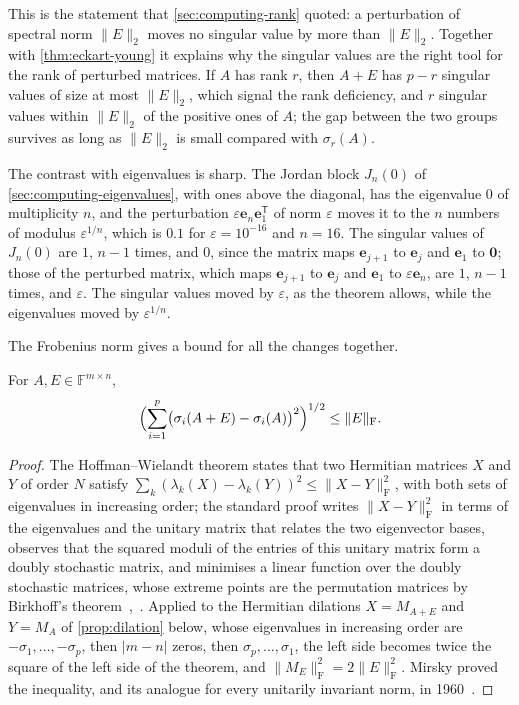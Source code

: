 This is the statement that \cref{sec:computing-rank} quoted: a perturbation of spectral norm $\|E\|_2$ moves no singular value by more than $\|E\|_2$. Together with \cref{thm:eckart-young} it explains why the singular values are the right tool for the rank of perturbed matrices. If $A$ has rank $r$, then $A+E$ has $p-r$ singular values of size at most $\|E\|_2$, which signal the rank deficiency, and $r$ singular values within $\|E\|_2$ of the positive ones of $A$; the gap between the two groups survives as long as $\|E\|_2$ is small compared with $\sigma_r(A)$.

The contrast with eigenvalues is sharp. The Jordan block $J_n(0)$ of \cref{sec:computing-eigenvalues}, with ones above the diagonal, has the eigenvalue $0$ of multiplicity $n$, and the perturbation $\varepsilon\mathbf e_n\mathbf e_1^{\mathsf T}$ of norm $\varepsilon$ moves it to the $n$ numbers of modulus $\varepsilon^{1/n}$, which is $0.1$ for $\varepsilon=10^{-16}$ and $n=16$. The singular values of $J_n(0)$ are $1$, $n-1$ times, and $0$, since the matrix maps $\mathbf e_{j+1}$ to $\mathbf e_j$ and $\mathbf e_1$ to $\mathbf 0$; those of the perturbed matrix, which maps $\mathbf e_{j+1}$ to $\mathbf e_j$ and $\mathbf e_1$ to $\varepsilon\mathbf e_n$, are $1$, $n-1$ times, and $\varepsilon$. The singular values moved by $\varepsilon$, as the theorem allows, while the eigenvalues moved by $\varepsilon^{1/n}$.

The Frobenius norm gives a bound for all the changes together.

\begin{theorem}[Mirsky]
\label{thm:mirsky}
For $A,E\in\mathbb F^{m\times n}$,
\[
\Bigl(\sum_{i=1}^p\bigl(\sigma_i(A+E)-\sigma_i(A)\bigr)^2\Bigr)^{1/2}\le\|E\|_{\mathrm F}.
\]
\end{theorem}

\begin{proof}
The Hoffman--Wielandt theorem states that two Hermitian matrices $X$ and $Y$ of order $N$ satisfy $\sum_k(\lambda_k(X)-\lambda_k(Y))^2\le\|X-Y\|_{\mathrm F}^2$, with both sets of eigenvalues in increasing order; the standard proof writes $\|X-Y\|_{\mathrm F}^2$ in terms of the eigenvalues and the unitary matrix that relates the two eigenvector bases, observes that the squared moduli of the entries of this unitary matrix form a doubly stochastic matrix, and minimises a linear function over the doubly stochastic matrices, whose extreme points are the permutation matrices by Birkhoff's theorem~\cite{hoffman1953},~\cite[Sect.~6.3]{horn2013}. Applied to the Hermitian dilations $X=M_{A+E}$ and $Y=M_A$ of \cref{prop:dilation} below, whose eigenvalues in increasing order are $-\sigma_1,\ldots,-\sigma_p$, then $|m-n|$ zeros, then $\sigma_p,\ldots,\sigma_1$, the left side becomes twice the square of the left side of the theorem, and $\|M_E\|_{\mathrm F}^2=2\|E\|_{\mathrm F}^2$. Mirsky proved the inequality, and its analogue for every unitarily invariant norm, in 1960~\cite{mirsky1960}.
\end{proof}

